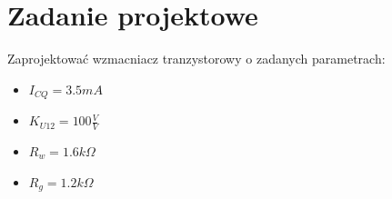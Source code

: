 \documentclass[a4paper,12pt]{article}
\begin{document}
\pagebreak
\section{Zadanie projektowe}
Zaprojektować wzmacniacz tranzystorowy o zadanych parametrach:
\begin{itemize}
\item $ I_{CQ}=3.5mA$
\item $ K_{U12}=100 \frac{V}{V}$
\item  $ R_w= 1.6 k\Omega$
\item  $R_g=1.2 k\Omega$
\end{itemize}
\end{document}

